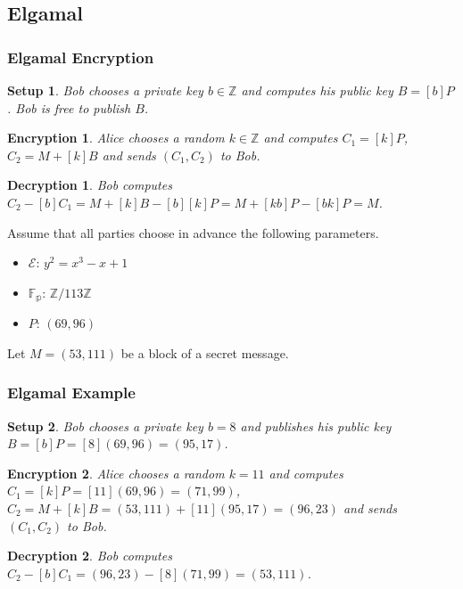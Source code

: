 \documentclass{beamer}
\newtheorem{setup}{Setup}
\newtheorem{encryption}{Encryption}
\newtheorem{decryption}{Decryption}
\newcommand{\zmod}[1]{\ensuremath{\mathbb{Z}/#1\mathbb{Z}}}
\begin{document}
    \subsection{Elgamal}
    \begin{frame}
        \frametitle{Elgamal Encryption}
        \begin{setup}
            Bob chooses a private key \(b \in \mathbb{Z}\) and computes
            his public key \(B = [b]P\). Bob is free to publish \(B\).
        \end{setup}
        \vfill
        \begin{encryption}
            Alice chooses a random \(k \in \mathbb{Z}\)
            and computes \(C_1 = [k]P\),
            \(C_2 = M + [k]B\) and sends \((C_1, C_2)\) to Bob.
        \end{encryption}
        \vfill
        \begin{decryption}
            Bob computes \(C_2 - [b]C_1 = M + [k]B - [b][k]P =
            M + [kb]P - [bk]P = M\).
        \end{decryption}
    \end{frame}

    \begin{frame}
        Assume that all parties choose in advance the
        following parameters.
        \begin{itemize}
            \item \(\mathcal{E}\): \(y^2 = x^3 - x + 1\)
            \item \(\mathbb{F_p}\): \zmod{113}
            \item \(P\): \((69, 96)\)
        \end{itemize}
        \vfill
        Let \(M = (53, 111)\) be a block of a secret message.
    \end{frame}

    \begin{frame}
        \frametitle{Elgamal Example}
        \begin{setup}
            Bob chooses a private key \(b = 8\) and publishes
            his public key \(B = [b]P = [8](69, 96) = (95, 17)\).
        \end{setup}
        \vfill
        \begin{encryption}
            Alice chooses a random \(k = 11\)
            and computes \(C_1 = [k]P = [11](69, 96) = (71, 99)\),
            \(C_2 = M + [k]B = (53, 111) + [11](95, 17) = (96, 23)\)
            and sends \((C_1, C_2)\) to Bob.
        \end{encryption}
        \vfill
        \begin{decryption}
            Bob computes \(C_2 - [b]C_1 = (96, 23) - [8](71, 99) = (53, 111)\).
        \end{decryption}
    \end{frame}
\end{document}
